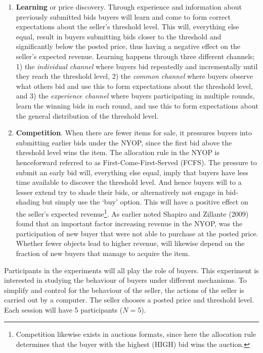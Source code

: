 \documentclass[a4paper,12pt]{article}
\begin{document}
	\begin{enumerate}
		\item {\bf Learning} or price discovery. Through experience and information about previously submitted bids buyers will learn and come to form correct expectations about the seller's threshold level. This will, everything else equal, result in buyers submitting bids closer to the threshold and significantly below the posted price, thus having a negative effect on the seller's expected revenue. Learning happens through three different channels; 1) the \emph{individual channel} where buyers bid repeatedly and incrementally until they reach the threshold level, 2) the \emph{common channel} where buyers observe what others bid and use this to form expectations about the threshold level, and 3) the \emph{experience channel} where buyers participating in multiple rounds, learn the winning bids in each round, and use this to form expectations about the general distribution of the threshold level.
	 	\item {\bf Competition}. When there are fewer items for sale, it pressures buyers into submitting earlier bids under the NYOP, since the first bid above the threshold level wins the item. The allocation rule in the NYOP is henceforward referred to as First-Come-First-Served (FCFS). The pressure to submit an early bid will, everything else equal, imply that buyers have less time available to discover the threshold level. And hence buyers will to a lesser extend try to shade their bids, or alternatively not engage in bid-shading but simply use the `buy' option. This will have a positive effect on the seller's expected revenue\footnote{Competition likewise exists in auctions formats, since here the allocation rule determines that the buyer with the highest (HIGH) bid wins the auction.}. As earlier noted Shapiro and Zillante (2009) found that an important factor increasing revenue in the NYOP, was the participation of new buyer that were not able to purchase at the posted price. Whether fewer objects lead to higher revenue, will likewise depend on the fraction of new buyers that manage to acquire the item.
	\end{enumerate}

	Participants in the experiments will all play the role of buyers. This experiment is interested in studying the behaviour of buyers under different mechanisms. To simplify and control for the behaviour of the seller, the actions of the seller is carried out by a computer. The seller chooses a posted price and threshold level. Each session will have 5 participants ($N=5$).
\end{document}
